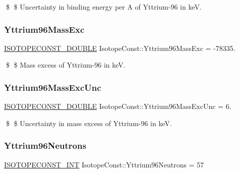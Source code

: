 \$ \$ Uncertainty in binding energy per A of Yttrium-\/96 in keV. \mbox{\label{group___isotope_const-_yttrium-_y96_gabfd55f5be78d1b7d3553da01d7d8f98f}} 
\subsubsection{\texorpdfstring{Yttrium96\+Mass\+Exc}{Yttrium96MassExc}}
{\footnotesize\ttfamily \mbox{\hyperlink{group___isotope_const-_macros_ga8f45a7272ce02c0b4c65c44636ed719a}{I\+S\+O\+T\+O\+P\+E\+C\+O\+N\+S\+T\+\_\+\+D\+O\+U\+B\+LE}} Isotope\+Const\+::\+Yttrium96\+Mass\+Exc = -\/78335.}

\$ \$ Mass excess of Yttrium-\/96 in keV. \mbox{\label{group___isotope_const-_yttrium-_y96_gab457f03a8c8ad2e743f505263498d8eb}} 
\subsubsection{\texorpdfstring{Yttrium96\+Mass\+Exc\+Unc}{Yttrium96MassExcUnc}}
{\footnotesize\ttfamily \mbox{\hyperlink{group___isotope_const-_macros_ga8f45a7272ce02c0b4c65c44636ed719a}{I\+S\+O\+T\+O\+P\+E\+C\+O\+N\+S\+T\+\_\+\+D\+O\+U\+B\+LE}} Isotope\+Const\+::\+Yttrium96\+Mass\+Exc\+Unc = 6.}

\$ \$ Uncertainty in mass excess of Yttrium-\/96 in keV. \mbox{\label{group___isotope_const-_yttrium-_y96_ga6f7455ea9fa7662ee8465133ce6f9dc1}} 
\subsubsection{\texorpdfstring{Yttrium96\+Neutrons}{Yttrium96Neutrons}}
{\footnotesize\ttfamily \mbox{\hyperlink{group___isotope_const-_macros_ga5f18360b3e99483a35c32d789e62621c}{I\+S\+O\+T\+O\+P\+E\+C\+O\+N\+S\+T\+\_\+\+I\+NT}} Isotope\+Const\+::\+Yttrium96\+Neutrons = 57}

